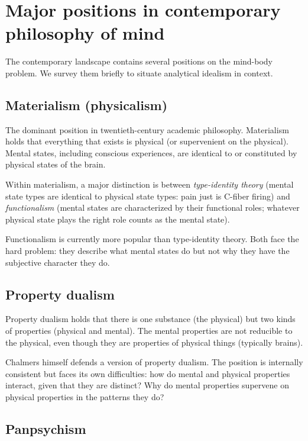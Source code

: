 \section{Major positions in contemporary philosophy of mind}
\label{sec:positions-overview}

The contemporary landscape contains several positions on the
mind-body problem. We survey them briefly to situate analytical
idealism in context.

\subsection{Materialism (physicalism)}

The dominant position in twentieth-century academic philosophy.
Materialism holds that everything that exists is physical (or
supervenient on the physical). Mental states, including conscious
experiences, are identical to or constituted by physical states of
the brain.

Within materialism, a major distinction is between
\emph{type-identity theory} (mental state types are identical to
physical state types: pain just is C-fiber firing) and
\emph{functionalism} (mental states are characterized by their
functional roles; whatever physical state plays the right role
counts as the mental state).

Functionalism is currently more popular than type-identity theory.
Both face the hard problem: they describe what mental states do but
not why they have the subjective character they do.

\subsection{Property dualism}

Property dualism holds that there is one substance (the physical)
but two kinds of properties (physical and mental). The mental
properties are not reducible to the physical, even though they are
properties of physical things (typically brains).

Chalmers himself defends a version of property dualism. The position
is internally consistent but faces its own difficulties: how do
mental and physical properties interact, given that they are
distinct? Why do mental properties supervene on physical properties
in the patterns they do?

\subsection{Panpsychism}

